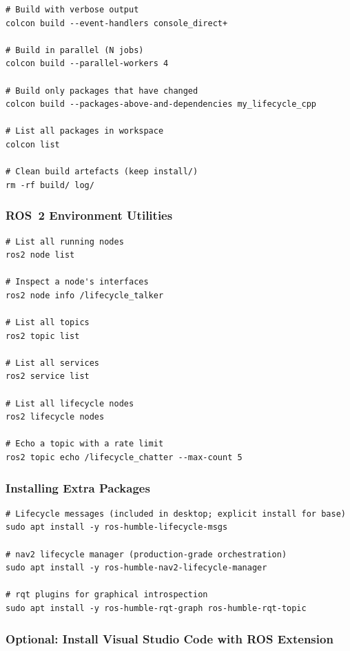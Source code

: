 \documentclass[12pt,a4paper]{article}
\begin{document}
\begin{lstlisting}[style=bash]
# Build with verbose output
colcon build --event-handlers console_direct+

# Build in parallel (N jobs)
colcon build --parallel-workers 4

# Build only packages that have changed
colcon build --packages-above-and-dependencies my_lifecycle_cpp

# List all packages in workspace
colcon list

# Clean build artefacts (keep install/)
rm -rf build/ log/
\end{lstlisting}

\subsubsection{ROS~2 Environment Utilities}

\begin{lstlisting}[style=bash]
# List all running nodes
ros2 node list

# Inspect a node's interfaces
ros2 node info /lifecycle_talker

# List all topics
ros2 topic list

# List all services
ros2 service list

# List all lifecycle nodes
ros2 lifecycle nodes

# Echo a topic with a rate limit
ros2 topic echo /lifecycle_chatter --max-count 5
\end{lstlisting}

\subsubsection{Installing Extra Packages}

\begin{lstlisting}[style=bash]
# Lifecycle messages (included in desktop; explicit install for base)
sudo apt install -y ros-humble-lifecycle-msgs

# nav2 lifecycle manager (production-grade orchestration)
sudo apt install -y ros-humble-nav2-lifecycle-manager

# rqt plugins for graphical introspection
sudo apt install -y ros-humble-rqt-graph ros-humble-rqt-topic
\end{lstlisting}

\subsubsection{Optional: Install Visual Studio Code with ROS Extension}
\end{document}
